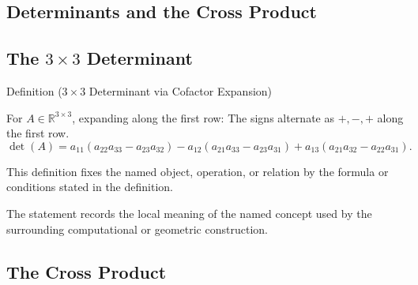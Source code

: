 
\subsection{Determinants and the Cross Product}

\subsection*{\texorpdfstring{The $3 \times 3$ Determinant}{The 3 x 3 Determinant}}

\begin{definitionbox}{Definition ($3 \times 3$ Determinant via Cofactor Expansion)}
\begin{definition}
\label{def:three-by-three-determinant-cofactor-expansion}
For $A \in \mathbb{R}^{3 \times 3}$, expanding along the first row:
The signs alternate as $+, -, +$ along the first row.
\[
  \det(A) = a_{11}(a_{22}a_{33} - a_{23}a_{32})
           - a_{12}(a_{21}a_{33} - a_{23}a_{31})
           + a_{13}(a_{21}a_{32} - a_{22}a_{31}).
\]
\end{definition}
\end{definitionbox}
\begin{remark*}
This definition fixes the named object, operation, or relation by the formula
or conditions stated in the definition.
\end{remark*}

\begin{remark*}[Interpretation]
The statement records the local meaning of the named concept used by the
surrounding computational or geometric construction.
\end{remark*}

\DefinitionalRoot

\subsection*{The Cross Product}

